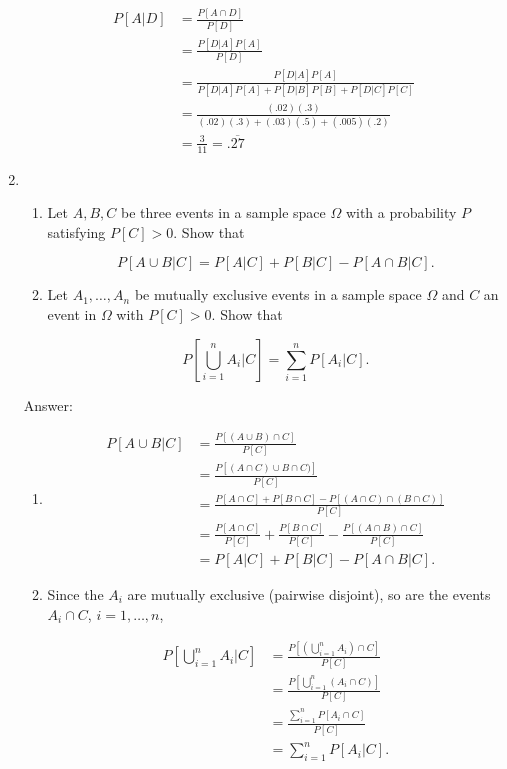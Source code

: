 \documentclass{article}
\begin{document}
\begin{enumerate}
\begin{align*}
P[A | D] &= \frac{P[A \cap D]}{P[D]} \\
&= \frac{P[D | A]P[A]}{P[D]} \\
&= \frac{P[D|A]P[A]}{P[D | A]P[A] + P[D|B]P[B] + P[D|C]P[C]} \\
&= \frac{(.02)(.3)}{(.02)(.3) + (.03)(.5) + (.005)(.2)} \\
&= \frac{3}{11} = .\overline{27}
\end{align*}


\newpage
\item

\begin{enumerate}
\item

Let $A,B,C$ be three events in a sample space $\Omega$ with a probability $P$ satisfying $P[C]>0$.  Show that

$$
P[A\cup B | C] = P[A|C] +P[B|C]-P[A\cap B|C].
$$ 

\item 

Let $A_1,\dots , A_n$ be mutually exclusive events in a sample space $\Omega$ and $C$ an event in $\Omega$ with $P[C]>0$.  Show that

$$
P\left[\bigcup_{i = 1}^n A_i | C \right] = \sum_{i=1}^n P[A_i | C].
$$
\end{enumerate}

Answer:

\begin{enumerate}
\item

\begin{align*}
P[A\cup B | C] &= \frac{P[(A\cup B) \cap C]}{P[C]} \\
&= \frac{P[(A\cap C) \cup B \cap C)]}{P[C]} \\
&= \frac{P[A\cap C]+ P[B \cap C] - P[(A\cap C) \cap (B \cap C)]}{P[C]} \\
&= \frac{P[A\cap C]}{P[C]} + \frac{P[B \cap C]}{P[C]} - \frac{P[(A\cap B) \cap C]}{P[C]} \\
&= P[A|C] +P[B|C]-P[A\cap B|C].
\end{align*}

\item Since the $A_i$ are mutually exclusive (pairwise disjoint), so are the events $A_i \cap C$, $i = 1,\dots , n$, 

\begin{align*}
P\left[\bigcup_{i = 1}^n A_i | C \right] &= \frac{P\left[\left(\bigcup_{i=1}^n A_i \right) \cap C\right]}{P[C]} \\
&= \frac{P\left[\bigcup_{i=1}^n (A_i \cap C)\right]}{P[C]} \\
&= \frac{\sum_{i=1}^n P[A_i \cap C]}{P[C]} \\
&= \sum_{i = 1}^n P[A_i | C] .
\end{align*}


\end{enumerate}
\end{enumerate}
\end{document}
